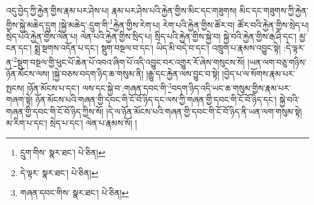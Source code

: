 འདུ་བྱེད་ཀྱི་རྐྱེན་གྱིས་རྣམ་པར་ཤེས་པ། རྣམ་པར་ཤེས་པའི་རྐྱེན་གྱིས་མིང་དང་གཟུགས། མིང་དང་གཟུགས་ཀྱི་རྐྱེན་གྱིས་སྐྱེ་མཆེད་དྲུག །སྐྱེ་མཆེད་:དྲུག་གི་\footnote{དྲུག་གིས་  སྣར་ཐང་།  པེ་ཅིན། }རྐྱེན་གྱིས་རེག་པ། རེག་པའི་རྐྱེན་གྱིས་ཚོར་བ། ཚོར་བའི་རྐྱེན་གྱིས་སྲེད་པ། སྲེད་པའི་རྐྱེན་གྱིས་ལེན་པ། ལེན་པའི་རྐྱེན་གྱིས་སྲིད་པ། སྲིད་པའི་རྐྱེན་གྱིས་སྐྱེ་བ། སྐྱེ་བའི་རྐྱེན་གྱིས་རྒ་ཤི་དང་། མྱ་ངན་དང་། སྨྲེ་སྔགས་འདོན་པ་དང་། སྡུག་བསྔལ་བ་དང་། ཡིད་མི་བདེ་བ་དང་། འཁྲུག་པ་རྣམས་འབྱུང་སྟེ། :དེ་ལྟར་ན་\footnote{དེ་ལྟར་  སྣར་ཐང་།  པེ་ཅིན། }སྡུག་བསྔལ་གྱི་ཕུང་པོ་ཆེན་པོ་འབའ་ཞིག་པོ་འདི་འབྱུང་བར་འགྱུར་རོ་ཞེས་གསུངས་སོ། །ཡན་ལག་བཅུ་གཉིས་ཉོན་མོངས་ལས། །སྐྱེ་བཅས་བདག་ཉིད་ཆ་གསུམ་ནི། །རྒྱུ་དང་རྐྱེན་ལས་བྱུང་བ་སྟེ། །བྱེད་པ་ལ་སོགས་རྣམ་པར་སྤངས། །ཉོན་མོངས་པ་དང་། ལས་དང་སྐྱེ་བ་:གཞན་དབང་གི་\footnote{གཞན་དབང་གིས་  སྣར་ཐང་།  པེ་ཅིན། }བདག་ཉིད་འདི་ཡང་ཆ་གསུམ་གྱིས་རྣམ་པར་གཞག་སྟེ། ཉོན་མོངས་པའི་གཞན་གྱི་དབང་གི་ངོ་བོ་ཉིད་དང་ལས་ཀྱི་གཞན་གྱི་དབང་གི་ངོ་བོ་ཉིད་དང་། སྐྱེ་བའི་གཞན་གྱི་དབང་གི་ངོ་བོ་ཉིད་ཀྱིས་སོ། །དེ་ལ་ཉོན་མོངས་པའི་གཞན་གྱི་དབང་གི་ངོ་བོ་ཉིད་ནི་ཡན་ལག་གསུམ་སྟེ། མ་རིག་པ་དང་། སྲེད་པ་དང་། ལེན་པ་རྣམས་སོ། །
